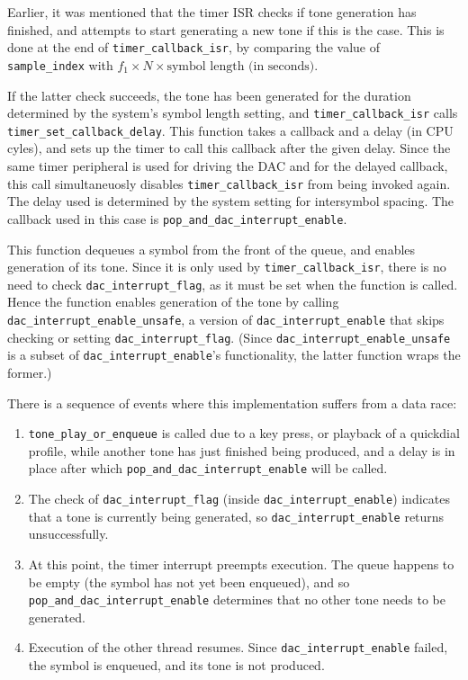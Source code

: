 \documentclass[11pt,a4paper,twocolumn]{scrartcl}
\begin{document}
Earlier, it was mentioned that the timer ISR checks if tone generation has finished, and attempts to start generating a new tone if this is the case. This is done at the end of \verb!timer_callback_isr!, by comparing the value of \verb!sample_index! with $f_1 \times N \times \text{symbol length (in seconds)}$.

If the latter check succeeds, the tone has been generated for the duration determined by the system's symbol length setting, and \verb!timer_callback_isr! calls \verb!timer_set_callback_delay!. This function takes a callback and a delay (in CPU cyles), and sets up the timer to call this callback after the given delay. Since the same timer peripheral is used for driving the DAC and for the delayed callback, this call simultaneuosly disables \verb!timer_callback_isr! from being invoked again. The delay used is determined by the system setting for intersymbol spacing. The callback used in this case is \verb!pop_and_dac_interrupt_enable!.

This function dequeues a symbol from the front of the queue, and enables generation of its tone. Since it is only used by \verb!timer_callback_isr!, there is no need to check \verb!dac_interrupt_flag!, as it must be set when the function is called. Hence the function enables generation of the tone by calling \verb!dac_interrupt_enable_unsafe!, a version of \verb!dac_interrupt_enable! that skips checking or setting \verb!dac_interrupt_flag!. (Since \verb!dac_interrupt_enable_unsafe! is a subset of \verb!dac_interrupt_enable!'s functionality, the latter function wraps the former.) 

There is a sequence of events where this implementation suffers from a data race:
\begin{enumerate}
   \item \verb!tone_play_or_enqueue! is called due to a key press, or playback of a quickdial profile, while another tone has just finished being produced, and a delay is in place after which \verb!pop_and_dac_interrupt_enable! will be called.
   \item The check of \verb!dac_interrupt_flag! (inside \verb!dac_interrupt_enable!) indicates that a tone is currently being generated, so \verb!dac_interrupt_enable! returns unsuccessfully.
   \item At this point, the timer interrupt preempts execution. The queue happens to be empty (the symbol has not yet been enqueued), and so \verb!pop_and_dac_interrupt_enable! determines that no other tone needs to be generated.
   \item Execution of the other thread resumes. Since \verb!dac_interrupt_enable! failed, the symbol is enqueued, and its tone is not produced. 
\end{enumerate}
\end{document}
